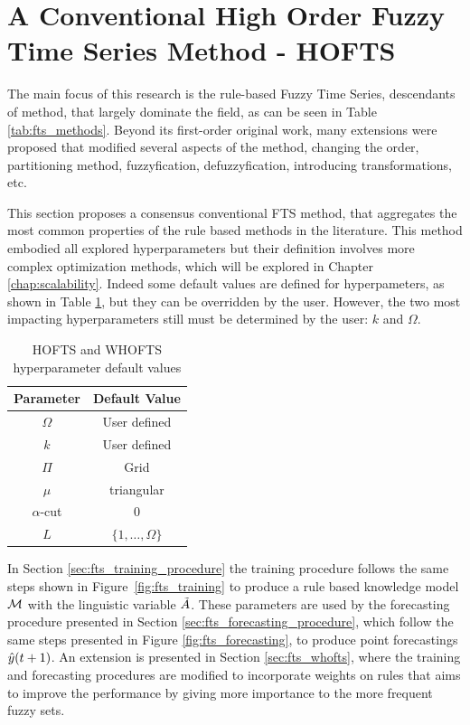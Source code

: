%
\section{A Conventional High Order Fuzzy Time Series Method - HOFTS}
\label{sec:fts_hofts}

The main focus of this research is the rule-based Fuzzy Time Series, descendants of \cite{chen1996forecasting} method, that  largely dominate the field, as can be seen in Table \ref{tab:fts_methods}. Beyond its first-order original work, many extensions were proposed that modified several aspects of the method, changing the order, partitioning method, fuzzyfication, defuzzyfication, introducing transformations, etc. 

This section proposes a consensus conventional FTS method, that aggregates the most common properties of the rule based methods in the literature. This method embodied all explored hyperparameters but their definition involves more complex optimization methods, which will be explored in Chapter \ref{chap:scalability}. Indeed some default values are defined for hyperpameters, as shown in Table \ref{tab:hofts_hyperparam}, but they can be overridden by the user. However, the two most impacting hyperparameters still must be determined by the user: $k$ and $\Omega$.

\begin{table}[htb] 
    \centering
    \begin{tabular}{|c|c|} \hline
        \textbf{Parameter} & \textbf{Default Value}  \\ \hline
        $\Omega$ & User defined  \\ \hline
        $k$ & User defined  \\ \hline
        $\Pi$ & Grid \\ \hline
        $\mu$ & triangular  \\ \hline 
        $\alpha$-cut & 0 \\ \hline
        $L$ & $\{1,\ldots,\Omega\}$  \\ \hline
    \end{tabular}
    \caption{HOFTS and WHOFTS hyperparameter default values}
    \label{tab:hofts_hyperparam}
\end{table}

In Section \ref{sec:fts_training_procedure} the training procedure follows the same steps shown in Figure~\ref{fig:fts_training} to produce a rule based knowledge model $\mathcal{M}$ with the linguistic variable $\tilde{A}$. These parameters are used by the forecasting procedure presented in Section \ref{sec:fts_forecasting_procedure}, which follow the same steps presented in Figure \ref{fig:fts_forecasting}, to produce point forecastings $\hat{y}(t+1)$. An extension is presented in Section \ref{sec:fts_whofts}, where the training and forecasting procedures are modified to incorporate weights on rules that aims to improve the performance by giving more importance to the more frequent fuzzy sets. 

